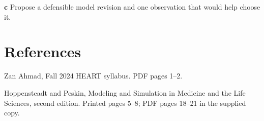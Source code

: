 \documentclass[11pt,letterpaper]{article}
\theoremstyle{definition}\newtheorem{definition}{Definition}\newtheorem{example}{Example}
\numberwithin{equation}{section}
\begin{document}
\textbf{c} Propose a defensible model revision and one observation that would help choose it.

\section*{References}
\noindent\begin{minipage}{\linewidth}
Zan Ahmad, Fall 2024 HEART syllabus. PDF pages 1--2.

\end{minipage}\par\medskip
\noindent\begin{minipage}{\linewidth}
Hoppensteadt and Peskin, Modeling and Simulation in Medicine and the Life Sciences, second edition. Printed pages 5--8; PDF pages 18--21 in the supplied copy.

\end{minipage}\par\medskip
\end{document}
